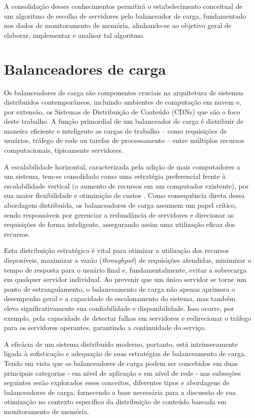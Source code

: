 A consolidação desses conhecimentos permitirá o estabelecimento conceitual de um algoritmo de escolha de servidores pelo balanceador de carga, fundamentado nos dados de monitoramento de memória, alinhando-se ao objetivo geral de elaborar, implementar e analisar tal algoritmo.

\section{Balanceadores de carga}

Os balanceadores de carga são componentes cruciais na arquitetura de sistemas distribuídos contemporâneos, incluindo ambientes de computação em nuvem e, por extensão, os Sistemas de Distribuição de Conteúdo (CDNs) que são o foco deste trabalho. A função primordial de um balanceador de carga é distribuir de maneira eficiente e inteligente as cargas de trabalho – como requisições de usuários, tráfego de rede ou tarefas de processamento – entre múltiplos recursos computacionais, tipicamente servidores.

A escalabilidade horizontal, caracterizada pela adição de mais computadores a um sistema, tem-se consolidado como uma estratégia preferencial frente à escalabilidade vertical (o aumento de recursos em um computador existente), por sua maior flexibilidade e otimização de custos \cite{scalabilityIssuesInDatabaseSystems}. Como consequência direta dessa abordagem distribuída, os balanceadores de carga assumem um papel crítico, sendo responsáveis por gerenciar a redundância de servidores e direcionar as requisições de forma inteligente, assegurando assim uma utilização eficaz dos recursos.

Esta distribuição estratégica é vital para otimizar a utilização dos recursos disponíveis, maximizar a vazão (\textit{throughput}) de requisições atendidas, minimizar o tempo de resposta para o usuário final e, fundamentalmente, evitar a sobrecarga em qualquer servidor individual. Ao prevenir que um único servidor se torne um ponto de estrangulamento, o balanceamento de carga não apenas aprimora o desempenho geral e a capacidade de escalonamento do sistema, mas também eleva significativamente sua confiabilidade e disponibilidade. Isso ocorre, por exemplo, pela capacidade de detectar falhas em servidores e redirecionar o tráfego para os servidores operantes, garantindo a continuidade do serviço.

A eficácia de um sistema distribuído moderno, portanto, está intrinsecamente ligada à sofisticação e adequação de suas estratégias de balanceamento de carga. Tendo em vista que os balanceadores de carga podem ser concebidos em duas principais categorias - em nível de aplicação e em nível de rede \cite{Pandian2022ICCBI} - nas subseções seguintes serão explorados esses conceitos, diferentes tipos e abordagens de balanceadores de carga, fornecendo a base necessária para a discussão de sua otimização no contexto específico da distribuição de conteúdo baseada em monitoramento de memória.

